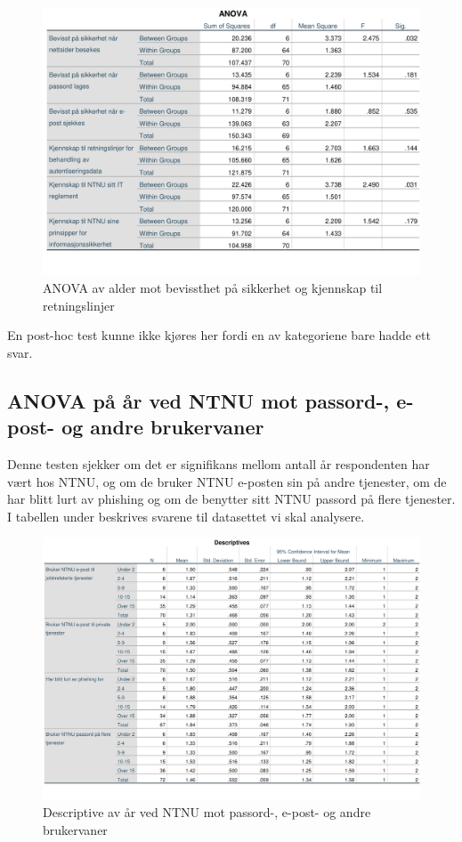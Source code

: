 \begin{figure}[H]
    \centering
    \includegraphics[scale=0.7]{case_2/bilder/spss/anova_ttest/alder_bevissthetogkjennskap_anova.pdf}
    \caption[alder-bevissthetogkjennskap-ANOVA]{ANOVA av alder mot bevissthet på sikkerhet og kjennskap til retningslinjer}
    \label{fig:alder-bevissthetogkjennskap-ANOVA}
\end{figure}

En post-hoc test kunne ikke kjøres her fordi en av kategoriene bare hadde ett svar. 

\subsection{ANOVA på år ved NTNU mot passord-, e-post- og andre brukervaner}
Denne testen sjekker om det er signifikans mellom antall år respondenten har vært hos NTNU, og om de bruker NTNU e-posten sin på andre tjenester, om de har blitt lurt av phishing og om de benytter sitt NTNU passord på flere tjenester. I tabellen under beskrives svarene til datasettet vi skal analysere.
\begin{figure}[H]
    \centering
    \includegraphics[scale=0.5]{case_2/bilder/spss/anova_ttest/ansiennitet_diverse_descriptive.pdf}
    \caption[ansiennitet-diverse-descriptive]{Descriptive av år ved NTNU mot passord-, e-post- og andre brukervaner}
    \label{fig:ansiennitet-diverse-descriptive}
\end{figure}

